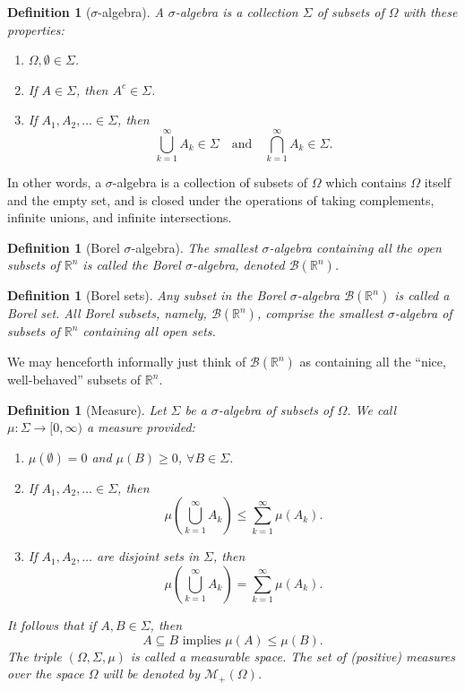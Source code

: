 \documentclass[11pt]{book}
\newtheorem{definition}[theorem]{Definition}
\begin{document}
\begin{definition}[$\sigma$-algebra]
A \(\sigma\)-algebra is a collection \(\Sigma\) of subsets of \(\Omega\) with these properties:
\begin{enumerate}
    \item[\emph{(i)}] \(\Omega, \emptyset \in \Sigma\).
    \item[\emph{(ii)}] If \(A \in \Sigma\), then \(A^c \in \Sigma\).
    \item[\emph{(iii)}] If \(A_1, A_2, \dots \in \Sigma\), then 
    \[
    \bigcup_{k=1}^{\infty} A_k \in \Sigma \quad \text{and} \quad \bigcap_{k=1}^{\infty} A_k \in \Sigma.
    \]
\end{enumerate}
\end{definition}
In other words, a $\sigma$-algebra is a collection of subsets of $\Omega$ which contains $\Omega$ itself and the empty set, and is closed under the operations of taking complements, infinite unions, and infinite intersections.



\begin{definition}[Borel $\sigma$-algebra]
The smallest \(\sigma\)-algebra containing all the open subsets of \(\mathbb{R}^n\) is called the Borel \(\sigma\)-algebra, denoted \( \mathcal{B}(\mathbb{R}^n) \). 
\end{definition}





\begin{definition}[Borel sets]
 Any subset in the Borel $\sigma$-algebra \( \mathcal{B}(\mathbb{R}^n) \) is called a Borel set. All Borel subsets, namely, \( \mathcal{B}(\mathbb{R}^n) \), comprise the smallest \(\sigma\)-algebra of subsets of \(\mathbb{R}^n\) containing all open sets.
\end{definition}
We may henceforth informally just think of \(\mathcal{B}(\mathbb{R}^n) \) as containing all the ``nice, well-behaved'' subsets of \(\mathbb{R}^n\).





\begin{definition}[Measure]
Let \(\Sigma\) be a \(\sigma\)-algebra of subsets of \(\Omega\). We call \(\mu: \Sigma \to [0,\infty)\) a measure provided:
\begin{enumerate}
    \item[\emph{(i)}] \(\mu(\emptyset) = 0\) and \(\mu(B)  \ge0\), $\forall B \in \Sigma$.
    \item[\emph{(ii)}] If \(A_1, A_2, \ldots \in \Sigma\), then
    \[
    \mu\left(\bigcup_{k=1}^\infty A_k\right) \leq \sum_{k=1}^\infty \mu(A_k).
    \]
    \item[\emph{(iii)}] If \(A_1, A_2, \ldots\) are disjoint sets in \(\Sigma\), then
    \[
    \mu\left(\bigcup_{k=1}^\infty A_k\right) = \sum_{k=1}^\infty \mu(A_k).
    \]
\end{enumerate}
It follows that if \(A, B \in \Sigma\), then
\[
A \subseteq B \text{ implies } \mu(A) \leq \mu(B).
\]
The triple $(\Omega,\Sigma,\mu)$ is called a measurable space. The set of (positive) measures over the space $\Omega$ will be denoted by $\mathcal{M}_+(\Omega)$.
\end{definition}
\end{document}
